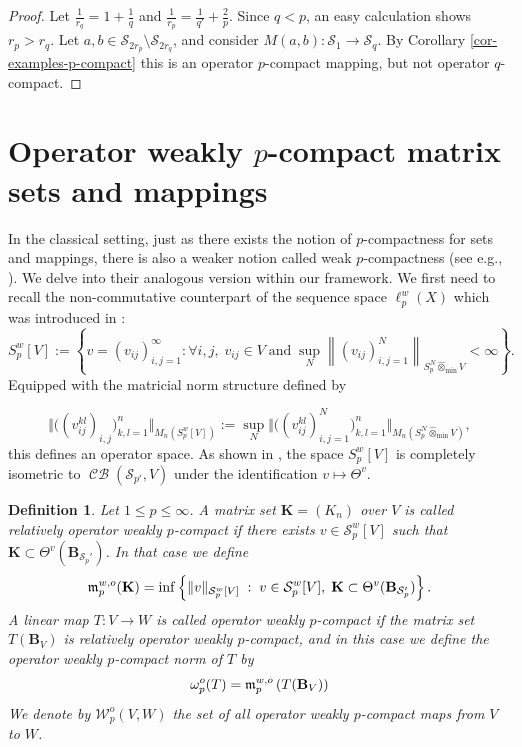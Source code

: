 \documentclass[11pt]{amsart}
\DeclareMathOperator{\CB}{\mathcal{CB}}
\newtheorem{definition}[theorem]{Definition}
\numberwithin{equation}{section}
\begin{document}
\begin{proof}
Let $\frac{1}{r_q} = 1+\frac1q$ and $\frac{1}{r_p} = \frac{1}{q'}+\frac{2}{p}$.
Since $q<p$, an easy calculation shows $r_p>r_q$.
Let $a,b \in \mathcal{S}_{2r_p} \setminus \mathcal{S}_{2r_q}$, and consider $M(a,b):\mathcal{S}_1 \to \mathcal{S}_q$. By Corollary \ref{cor-examples-p-compact} this is an operator $p$-compact mapping, but not operator $q$-compact.
\end{proof}



\section{Operator weakly $p$-compact matrix sets and mappings}\label{sect-weakly-p-compact}

In the classical setting, just as there exists the notion of $p$-compactness for sets and mappings, there is also a weaker notion called weak $p$-compactness (see e.g., \cite[Def. 2.3 and 2.4]{Sinha-Karn}). We delve into their analogous version within our framework.
We first need to recall the non-commutative counterpart of the sequence space $\ell_p^w(X)$ which was introduced in \cite{ChaDiGa-Operator-p-compact}:  
$$ S_p^w[V] := \left\{ v=(v_{ij})_{i, j =1}^{\infty}  : \forall i,j, \; v_{ij}\in V \; \mbox{and} \;  \sup_N \left\| (v_{ij})_{i,j=1}^N \right\|_{S_p^N \widehat{\otimes}_{\min} V} < \infty \right\}. $$  
Equipped with the matricial norm structure defined by


$$ \Vert  \big ((v_{ij}^{kl})_{i,j} \big)_{k,l=1}^n  \Vert_{M_n(S_{p}^w[V])} := \sup_{N} \Vert \big((v_{ij}^{kl})_{i,j=1}^N \big)_{k,l=1}^{n} \Vert_{M_n(S_p^N \widehat{\otimes}_{\min} V) },$$
this defines an operator space. As shown in \cite[Lem. 2.4]{ChaDiGa-Operator-p-compact}, the space $S_p^w[V]$ is completely isometric to $\CB(\mathcal{S}_{p'},V)$ under the identification $v \mapsto \Theta^{v}$.

\begin{definition}
Let $1 \le p \le \infty$.
 A matrix set $\mathbf{K}=(K_n)$ over $V$ is called \emph{relatively operator weakly $p$-compact} if there exists $v \in \mathcal{S}_p^w[V]$ such that $\mathbf{K}\subset \Theta^v(\mathbf{B}_{\mathcal{S}_p'})$. In that case  we define
\[
\frak{ m}^{w,o}_p(\mathbf{K}) = \inf\left\{\| v\|_{ \mathcal{S}_p^w[V] } \;:\; v\in  \mathcal{S}_p^w[V], \; \mathbf{K}\subset \Theta^v(\mathbf{B}_{\mathcal{S}_p'}) \right\}.
\]
A linear map $T : V \to W$ is called \emph{operator weakly $p$-compact} if the matrix set $T(\mathbf{B}_V)$ is relatively operator weakly $p$-compact, and in this case we define the operator weakly $p$-compact norm of $T$ by
\[
\omega_p^o(T) = \frak{ m}^{w,o}_p\left( T(\mathbf{B}_V) \right)
\]
We denote by $\mathcal{W}_p^o(V,W)$ the set of all operator weakly $p$-compact maps from $V$ to $W$.
\end{definition}
\end{document}
